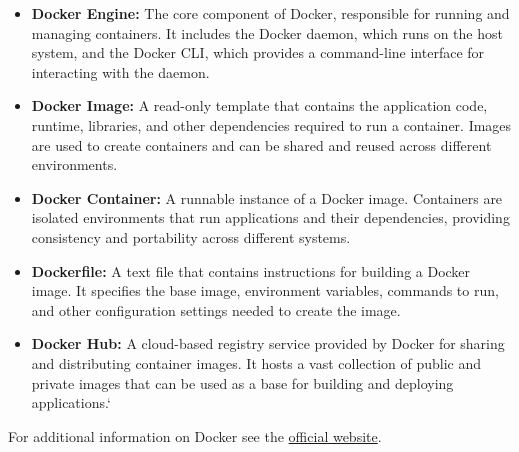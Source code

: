 \begin{itemize}
  \item \textbf{Docker Engine:} The core component of Docker, responsible for running and managing containers. It includes the Docker daemon, which runs on the host system, and the Docker \ac{CLI}, which provides a command-line interface for interacting with the daemon.
  \item \textbf{Docker Image:} A read-only template that contains the application code, runtime, libraries, and other dependencies required to run a container. Images are used to create containers and can be shared and reused across different environments.
  \item \textbf{Docker Container:} A runnable instance of a Docker image. Containers are isolated environments that run applications and their dependencies, providing consistency and portability across different systems.
  \item \textbf{Dockerfile:} A text file that contains instructions for building a Docker image. It specifies the base image, environment variables, commands to run, and other configuration settings needed to create the image.
  \item \textbf{Docker Hub:} A cloud-based registry service provided by Docker for sharing and distributing container images. It hosts a vast collection of public and private images that can be used as a base for building and deploying applications.`
\end{itemize}
For additional information on Docker see the \href{https://www.docker.com/}{official website}.
